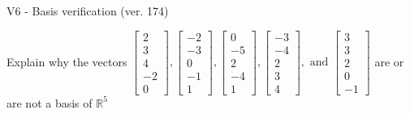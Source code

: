\begin{exercise}
  \begin{exerciseTitle}V6 - Basis verification (ver. 174)\end{exerciseTitle}
  \begin{exerciseStatement}
    Explain why the vectors \(\left[\begin{array}{r}
2 \\
3 \\
4 \\
-2 \\
0
\end{array}\right] , \left[\begin{array}{r}
-2 \\
-3 \\
0 \\
-1 \\
1
\end{array}\right] , \left[\begin{array}{r}
0 \\
-5 \\
2 \\
-4 \\
1
\end{array}\right] , \left[\begin{array}{r}
-3 \\
-4 \\
2 \\
3 \\
4
\end{array}\right] , \text{ and } \left[\begin{array}{r}
3 \\
3 \\
2 \\
0 \\
-1
\end{array}\right]\) are or are not a basis of \(\mathbb{R}^5\)	



\end{exerciseStatement}
\end{exercise}
